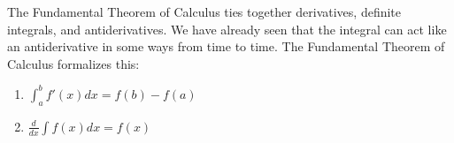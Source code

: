 \documentclass[../revisedmain.tex]{subfiles}
\begin{document}
The Fundamental Theorem of Calculus ties together derivatives, definite integrals, and antiderivatives. We have already seen that the integral can act like an antiderivative in some ways from time to time. The Fundamental Theorem of Calculus formalizes this:
\begin{enumerate}
	\item $\displaystyle\int_{a}^{b}f'(x)dx=f(b)-f(a)$
	\item $\displaystyle\frac{d}{dx}\displaystyle\int f(x)dx=f(x)$
\end{enumerate}
\end{document}
